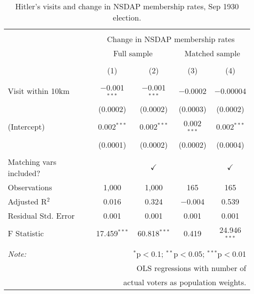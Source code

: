 
\begin{table}[!htbp] \centering 
  \caption{Hitler's visits and change in NSDAP membership rates, Sep 1930 election.} 
  \label{tab:ols-d_p_members-1} 
\begin{tabular}{@{\extracolsep{5pt}}lcccc} 
\\[-1.8ex]\hline 
\hline \\[-1.8ex] 
 & \multicolumn{4}{c}{Change in NSDAP membership rates} \\ 
\cline{2-5} 
 & \multicolumn{2}{c}{Full sample} & \multicolumn{2}{c}{Matched sample} \\ 
\\[-1.8ex] & (1) & (2) & (3) & (4)\\ 
\hline \\[-1.8ex] 
 Visit within 10km & $-$0.001$^{***}$ & $-$0.001$^{***}$ & $-$0.0002 & $-$0.00004 \\ 
  & (0.0002) & (0.0002) & (0.0003) & (0.0002) \\ 
  (Intercept) & 0.002$^{***}$ & 0.002$^{***}$ & 0.002$^{***}$ & 0.002$^{***}$ \\ 
  & (0.0001) & (0.0002) & (0.0002) & (0.0004) \\ 
 \hline \\[-1.8ex] 
Matching vars included? &  & \multicolumn{1}{c}{$\checkmark$} &  & \multicolumn{1}{c}{$\checkmark$} \\ 
Observations & 1,000 & 1,000 & 165 & 165 \\ 
Adjusted R$^{2}$ & 0.016 & 0.324 & $-$0.004 & 0.539 \\ 
Residual Std. Error & 0.001 & 0.001 & 0.001 & 0.001 \\ 
F Statistic & 17.459$^{***}$ & 60.818$^{***}$ & 0.419 & 24.946$^{***}$ \\ 
\hline 
\hline \\[-1.8ex] 
\textit{Note:}  & \multicolumn{4}{r}{$^{*}$p$<$0.1; $^{**}$p$<$0.05; $^{***}$p$<$0.01} \\ 
 & \multicolumn{4}{r}{OLS regressions with number of} \\ 
 & \multicolumn{4}{r}{actual voters as population weights.} \\ 
\end{tabular} 
\end{table} 
